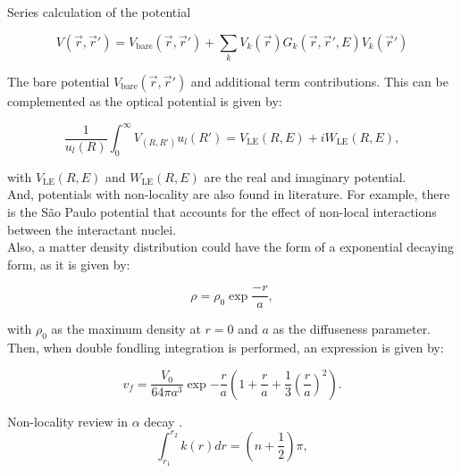 \documentclass[openany]{book}
\begin{document}
Series calculation of the potential

\begin{equation}\label{potential_nonLocal_seriesV}
	V(\vec r, \vec r') = V_{\mathrm{bare}}(\vec r, \vec r') + \sum_k{V_k(\vec r)G_k (\vec r, \vec r', E)V_k(\vec r') }
\end{equation}

The bare potential $V_{\mathrm{bare}}(\vec r, \vec r') $ and additional term contributions.  This can be complemented as the optical potential is given by:


\begin{equation}\label{potential_nonLocal_optical}
	\frac{1}{u_l(R)} 	\int_{0}^{\infty} {V_(R, R') u_l(R')} = V_\mathrm{LE}(R, E) + i W_\mathrm{LE}(R, E), 
\end{equation}

with $V_\mathrm{LE}(R, E)$ and $W_\mathrm{LE}(R, E)$ are the real and imaginary potential.\\

And, potentials with non-locality are also found in literature. For example, there is the São Paulo potential that accounts for the effect of non-local interactions between the interactant nuclei. \\

Also, a matter density distribution could have the form of a exponential decaying form, as it is given by:

\begin{equation}\label{potential_nonLocal_density_exp}
	\rho = \rho_0 \exp{\frac{-r}{a}},
\end{equation}

with $\rho_0$ as the maximum density at $r = 0$ and $a$ as the diffuseness parameter. Then, when double fondling integration is performed, an expression is given by:

\begin{equation}\label{potential_nonLocal_density_vf}
	v_f = \frac{V_0}{64\pi a^3} \exp {-\frac{r}{a}} \left(1 + \frac{r}{a} + \frac{1}{3} \left(\frac{r}{a}\right)^2 \right).
\end{equation}

Non-locality review in $\alpha$ decay \cite{rojas-gamboa_velasquez_kelkar_upadhyay_2022}. \\

\begin{equation}\label{potential_nonLocal_WKB_quantization}
	\int_{r_1}^{r_2} {k(r) dr} = \left (n + \frac{1}{2} \right )\pi,
\end{equation}
\end{document}
